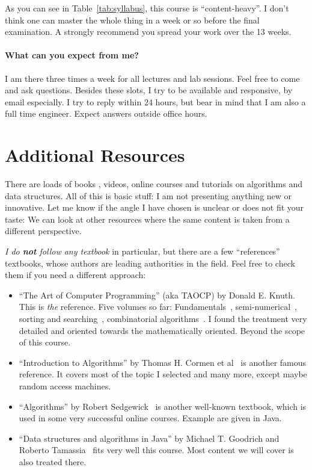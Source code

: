 \documentclass{aldast}
\begin{document}
As you can see in Table~\ref{tab:syllabus}, this course is
``content-heavy''. I don't think one can master the whole thing in a
week or so before the final examination. A strongly recommend you
spread your work over the 13 weeks.

\paragraph {What can you expect from me?}

I am there three times a week for all lectures and lab sessions. Feel
free to come and ask questions. Besides these slots, I try to be
available and responsive, by email
especially. I try to
reply within 24 hours, but bear in mind that I am also a full time
engineer. Expect answers outside office hours.


\section{Additional Resources}

There are loads of books
\cite{atto1974,melhorn2008,levitin2011,weiss2014,skiena2020}, videos,
online courses and tutorials on algorithms and data structures. All of
this is basic stuff: I am not presenting anything new or
innovative. Let me know if the angle I have chosen is unclear or does not
fit your taste: We can look at other resources where the same content
is taken from a different perspective.

\emph{I do \textbf{not} follow any textbook} in particular, but there are a few
``references'' textbooks, whose authors are leading authorities in the
field. Feel free to check them if you need a different approach:

\begin{itemize}
\item ``The Art of Computer Programming'' (aka TAOCP) by Donald
  E. Knuth. This is \emph{the} reference. Five volumes so far:
  Fundamentals~\cite{knuth1978}, semi-numerical~\cite{knuth1997},
  sorting and searching~\cite{knuth1998}, combinato\-rial
  al\-go\-ri\-thms~\cite{knuth2011}. I found the treatment very detailed
  and oriented towards the mathematically oriented. Beyond the scope
  of this course.
\item ``Introduction to Algorithms'' by Thomas H. Cormen et
  al~\cite{cormen2009} is another famous reference. It covers most of
  the topic I selected and many more, except maybe random access
  machines.
\item ``Algorithms'' by Robert Sedgewick~\cite{sedgewick2014} is another
  well-known textbook, which is used in some very successful online
  courses. Example are given in Java.
\item ``Data structures and algorithms in Java'' by Michael
  T. Goodrich and Roberto Tamassia~\cite{goodrich2014} fits very well this
  course. Most content we will cover is also treated there.
\end{itemize}
\end{document}
